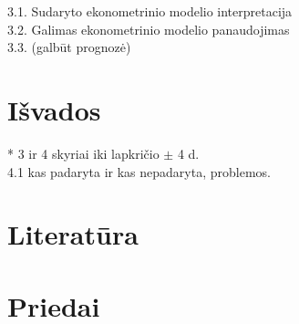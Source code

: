 \documentclass[a4paper]{article}
\begin{document}
	3.1. Sudaryto ekonometrinio modelio interpretacija\\


	3.2. Galimas ekonometrinio modelio panaudojimas\\

	3.3. (galbūt prognozė)\\

\section{Išvados}

* 3 ir 4 skyriai iki lapkričio $\pm$ 4 d. \\

	4.1 kas padaryta ir kas nepadaryta, problemos.\\

\section{Literatūra}
\section{Priedai}
	
\end{document}
